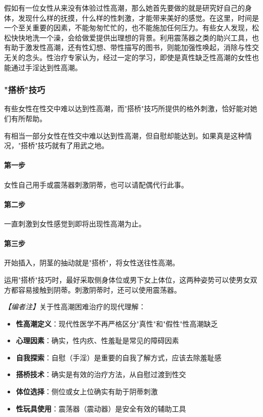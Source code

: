 \begin{enumerate}
假如有一位女性从来没有体验过性高潮，那么她首先要做的就是研究好自己的身体，发现什么样的抚摸，什么样的性刺激，才能带来美好的感觉。在这里，时间是一个至关重要的因素，不能匆匆忙忙的，也不能施加任何压力。有些女人发现，松松快快地洗一个澡，会给做爱提供出理想的背景。利用震荡器之类的助兴工具，也有助于激发性高潮，还有性幻想、带性描写的图书，则能加强性唤起，消除与性交无关的念头。性治疗专家认为，经过一定的学习，即使是真性缺乏性高潮的女性也能通过手淫达到性高潮。

\subsubsection{"搭桥"技巧}

有些女性在性交中难以达到性高潮，而"搭桥"技巧所提供的格外刺激，恰好能对她们有所帮助。

有相当一部分女性在性交中难以达到性高潮，但自慰却能达到。如果真是这种情况，"搭桥"技巧就有了用武之地。

\paragraph{第一步}
女性自己用手或震荡器刺激阴蒂，也可以请配偶代行此事。

\paragraph{第二步}
一直刺激到女性感觉到即将出现性高潮为止。

\paragraph{第三步}
开始插入，阴茎的抽动就是"搭桥"，将女性送往性高潮。

运用"搭桥"技巧时，最好采取侧身体位或男下女上体位，这两种姿势可以使男女双方都容易接触到阴蒂。刺激阴蒂时，还可以使用震荡器。

\noindent\textit{【编者注】}关于性高潮困难治疗的现代理解：
\begin{itemize}
	\item \textbf{性高潮定义}：现代性医学不再严格区分"真性"和"假性"性高潮缺乏
	\item \textbf{心理因素}：确实，性内疚、性羞耻是常见的障碍因素
	\item \textbf{自我探索}：自慰（手淫）是重要的自我了解方式，应该去除羞耻感
	\item \textbf{搭桥技术}：确实是有效的治疗方法，从自慰过渡到性交
	\item \textbf{体位选择}：侧位或女上位确实有助于阴蒂刺激
	\item \textbf{性玩具使用}：震荡器（震动器）是安全有效的辅助工具
\end{itemize}


\end{enumerate}
